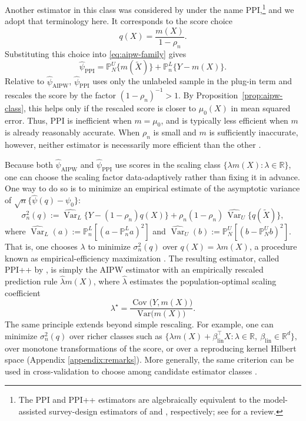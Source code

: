 \documentclass{article}
\theoremstyle{plain}
\theoremstyle{definition}
\newcommand{\Var}{\mathrm{Var}}
\newcommand{\1}{\mathbf{1}}
\newcommand{\Pl}{\mathbb{P}^{L}_n}
\newcommand{\Pu}{\mathbb{P}^{U}_N}
\newcommand{\Cov}{\operatorname{Cov}}
\begin{document}
Another estimator in this class was considered by \citet{ppi2023} under the name PPI,\footnote{The PPI and PPI++ estimators are algebraically equivalent to the model-assisted survey-design estimators of \citet{cassel1976some} and \citet{sarndal2003model}, respectively; see \citet{mozer2026ppi} for a review.} and we adopt that terminology here. It corresponds to the score choice
\[
q(X)=\frac{m(X)}{1-\rho_n}.
\]
Substituting this choice into \eqref{eq:aipw-family} gives
\[
\widehat{\psi}_{\mathrm{PPI}}
=
\Pu\{m(\widetilde X)\}+\Pl\{Y-m(X)\}.
\]
Relative to \(\widehat{\psi}_{\mathrm{AIPW}}\), \(\widehat{\psi}_{\mathrm{PPI}}\) uses only the unlabeled sample in the plug-in term and rescales the score by the factor \((1-\rho_n)^{-1}>1\). By Proposition~\ref{prop:aipw-class}, this helps only if the rescaled score is closer to \(\mu_0(X)\) in mean squared error. Thus, PPI is inefficient when \(m=\mu_0\), and is typically less efficient when \(m\) is already reasonably accurate. When \(\rho_n\) is small and \(m\) is sufficiently inaccurate, however, neither estimator is necessarily more efficient than the other \citep{han2012note,rotnitzky2012improved}.

Because both \(\widehat{\psi}_{\mathrm{AIPW}}\) and \(\widehat{\psi}_{\mathrm{PPI}}\) use scores in the scaling class \(\{\lambda m(X):\lambda\in\mathbb R\}\), one can choose the scaling factor data-adaptively rather than fixing it in advance. One way to do so is to minimize an empirical estimate of the asymptotic
variance of \(\sqrt n\{\widehat\psi(q)-\psi_0\}\):
\[
\sigma_n^2(q):=
\widehat{\operatorname{Var}}_L
\{Y-(1-\rho_n)q(X)\}
+\rho_n(1-\rho_n)\,\widehat{\operatorname{Var}}_U\{q(\widetilde X)\},
\]
where \(\widehat{\operatorname{Var}}_L(a):=\Pl[(a-\Pl a)^2]\) and
\(\widehat{\operatorname{Var}}_U(b):=\Pu[(b-\Pu b)^2]\).
That is, one chooses \(\lambda\) to minimize \(\sigma_n^2(q)\) over \(q(X)=\lambda m(X)\), a procedure known as empirical-efficiency maximization \citep{rubin2008empirical,vanderlaanunified}. The resulting estimator, called PPI++ by \citet{angelopoulos2023ppi}, is simply the AIPW estimator with an empirically rescaled prediction rule \(\hat\lambda m(X)\), where \(\hat\lambda\) estimates the population-optimal scaling coefficient
\begin{equation}
\label{opt:scale-app}
\lambda^\star
=
\frac{\Cov\bigl(Y,m(X)\bigr)}{\Var\bigl(m(X)\bigr)}.
\end{equation}
The same principle extends beyond simple rescaling. For example, one can minimize \(\sigma_n^2(q)\) over richer classes such as $\{\lambda m(X)+\beta_{\mathrm{lin}}^\top X:
\lambda \in \mathbb R,\ \beta_{\mathrm{lin}} \in \mathbb R^d\},$
over monotone transformations of the score, or over a reproducing kernel Hilbert space (Appendix \ref{appendix:remarks}). More generally, the same criterion can be used in cross-validation to choose among candidate estimator classes \citep{rubin2008empirical}.
\end{document}
